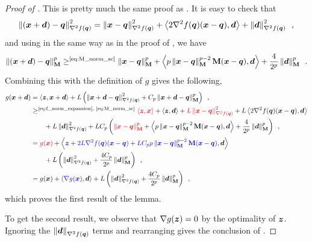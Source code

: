 \begin{proof}[Proof of ]
This is pretty much the same proof as . It is easy to check that
\begin{align}
    \left\lVert (\bm{x}+\bm{d})-\bm{q} \right\rVert_{\nabla^2 f(\bm{q})}^2 = \left\lVert \bm{x}-\bm{q} \right\rVert_{\nabla^2 f(\bm{q})}^2 + \left\langle 2\nabla^2 f(\bm{q})(\bm{x}-\bm{q}),\bm{d} \right\rangle + \left\lVert \bm{d} \right\rVert_{\nabla^2 f(\bm{q})}^2\enspace,\label{eq:f_norm_expansion}
\end{align}
and using  in the same way as in the proof of , we have
\begin{align*}
    \left\lVert (\bm{x}+\bm{d})-\bm{q} \right\rVert_{\mathbf{M}}^p \ge^{\text{\eqref{eq:M_norm_sc}}} \left\lVert \bm{x}-\bm{q} \right\rVert_{\mathbf{M}}^p + \left\langle p\left\lVert \bm{x}-\bm{q} \right\rVert_{\mathbf{M}}^{p-2}\mathbf{M}(\bm{x}-\bm{q}),\bm{d} \right\rangle + \frac{4}{2^p}\left\lVert \bm{d} \right\rVert_{\mathbf{M}}^p\enspace.
\end{align*}
Combining this with the definition of $g$ gives the following,
\begin{align*}
    g(\bm{x}+\bm{d}) &= \left\langle \bm{z},\bm{x} + \bm{d} \right\rangle + L\left(\left\lVert \bm{x} + \bm{d}-\bm{q} \right\rVert_{\nabla^2 f(\bm{q})}^2 + C_p\left\lVert \bm{x} + \bm{d} -\bm{q} \right\rVert_{\mathbf{M}}^p\right)\enspace,\\
    &\geq^{\text{\eqref{eq:f_norm_expansion}, \eqref{eq:M_norm_sc}}} \textcolor{red}{\left\langle \bm{z},\bm{x} \right\rangle} +  \left\langle \bm{z},\bm{d} \right\rangle + \textcolor{red}{L\left\lVert \bm{x}-\bm{q} \right\rVert_{\nabla^2 f(\bm{q})}^2} + L\left\langle 2\nabla^2 f(\bm{q})(\bm{x}-\bm{q}),\bm{d} \right\rangle\\
    &\qquad + L\left\lVert \bm{d} \right\rVert_{\nabla^2 f(\bm{q})}^2 + LC_p\left(\textcolor{red}{\left\lVert \bm{x}-\bm{q} \right\rVert_{\mathbf{M}}^p} + \left\langle p\left\lVert \bm{x}-\bm{q} \right\rVert_{\mathbf{M}}^{p-2}\mathbf{M}(\bm{x}-\bm{q}),\bm{d} \right\rangle + \frac{4}{2^p}\left\lVert \bm{d} \right\rVert_{\mathbf{M}}^p\right)\enspace,\\
    &=  \textcolor{red}{g(\bm{x})}  + \left\langle \textcolor{blue}{\bm{z}} + \textcolor{blue}{2L\nabla^2 f(\bm{q})(\bm{x}-\bm{q})} + \textcolor{blue}{LC_pp\left\lVert \bm{x}-\bm{q} \right\rVert_{\mathbf{M}}^{p-2}\mathbf{M}(\bm{x}-\bm{q})},\bm{d} \right\rangle \\
    &\qquad  + L\left(\left\lVert \bm{d} \right\rVert_{\nabla^2 f(\bm{q})}^2 + \frac{4C_p}{2^p}\left\lVert \bm{d} \right\rVert_{\mathbf{M}}^p\right)\enspace,\\
    &= g(\bm{x}) + \left\langle \textcolor{blue}{\nabla g(\bm{x})},\bm{d} \right\rangle + L\left(\left\lVert \bm{d} \right\rVert_{\nabla^2 f(\bm{q})}^2 + \frac{4C_p}{2^p}\left\lVert \bm{d} \right\rVert_{\mathbf{M}}^p\right)\enspace,
\end{align*}
which proves the first result of the lemma.

To get the second result, we observe that $\nabla g(\bm{z}) = 0$ by the optimality of $\bm{z}$. Ignoring the $\left\lVert \bm{d} \right\rVert_{\nabla^2 f(\bm{q})}$ terms and rearranging gives the conclusion of .
\end{proof}

